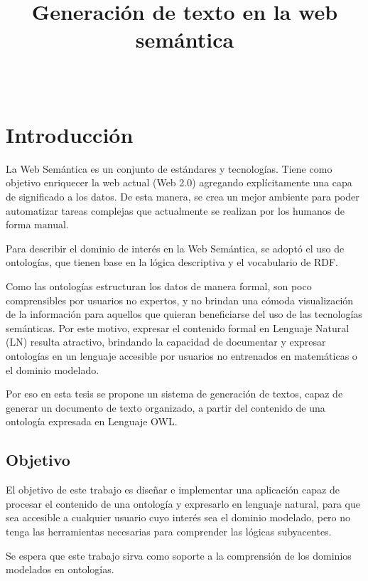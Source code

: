 \documentclass[11pt,a4paper,spanish]{book}
\begin{document}
	
\title{Generación de texto en la web semántica}
\author{\ }
\date{}
\maketitle

\frontmatter
\tableofcontents
\mainmatter

\chapter{Introducción}
La Web Semántica es un conjunto de estándares y tecnologías. Tiene como objetivo enriquecer la web actual (Web 2.0) agregando explícitamente una capa de significado a los datos. De esta manera, se crea un mejor ambiente para poder automatizar tareas complejas que actualmente se realizan por los humanos de forma manual. 

Para describir el dominio de interés en la Web Semántica, se adoptó el uso de ontologías, que tienen base en la lógica descriptiva y el vocabulario de RDF.

Como las ontologías estructuran los datos de manera formal, son poco comprensibles por usuarios no expertos, y no brindan una cómoda visualización de la información para aquellos que quieran beneficiarse del uso de las tecnologías semánticas. Por este motivo, expresar el contenido formal en Lenguaje Natural (LN) resulta atractivo, brindando la capacidad de documentar y expresar ontologías en un lenguaje accesible por usuarios no entrenados en matemáticas o el dominio modelado. 

Por eso en esta tesis se propone un sistema de generación de textos, capaz de generar un documento de texto organizado, a partir del contenido de una ontología expresada en Lenguaje OWL.

\section{Objetivo}\label{Intro:objetivo}
El objetivo de este trabajo es diseñar e implementar una aplicación capaz de procesar el contenido de una ontología y expresarlo en lenguaje natural, para que sea accesible a cualquier usuario cuyo interés sea el dominio modelado, pero no tenga las herramientas necesarias para comprender las lógicas subyacentes.

Se espera que este trabajo sirva como soporte a la comprensión de los dominios modelados en ontologías.
\end{document}

